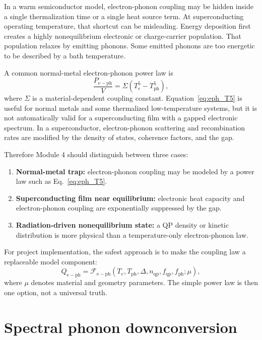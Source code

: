 \documentclass[11pt]{article}
\begin{document}
In a warm semiconductor model, electron-phonon coupling may be hidden inside a single thermalization time or a single heat source term. At superconducting operating temperature, that shortcut can be misleading. Energy deposition first creates a highly nonequilibrium electronic or charge-carrier population. That population relaxes by emitting phonons. Some emitted phonons are too energetic to be described by a bath temperature.

A common normal-metal electron-phonon power law is
\begin{equation}
\frac{P_{\mathrm{e-ph}}}{V}=\Sigma\left(T_e^5-T_{\mathrm{ph}}^5\right),
\label{eq:eph_T5}
\end{equation}
where \(\Sigma\) is a material-dependent coupling constant. Equation~\eqref{eq:eph_T5} is useful for normal metals and some thermalized low-temperature systems, but it is not automatically valid for a superconducting film with a gapped electronic spectrum. In a superconductor, electron-phonon scattering and recombination rates are modified by the density of states, coherence factors, and the gap.

Therefore Module 4 should distinguish between three cases:
\begin{enumerate}[label=\arabic*.]
\item \textbf{Normal-metal trap:} electron-phonon coupling may be modeled by a power law such as Eq.~\eqref{eq:eph_T5}.
\item \textbf{Superconducting film near equilibrium:} electronic heat capacity and electron-phonon coupling are exponentially suppressed by the gap.
\item \textbf{Radiation-driven nonequilibrium state:} a QP density or kinetic distribution is more physical than a temperature-only electron-phonon law.
\end{enumerate}

For project implementation, the safest approach is to make the coupling law a replaceable model component:
\begin{equation}
Q_{\mathrm{e-ph}} = \mathcal{F}_{\mathrm{e-ph}}(T_e,T_{\mathrm{ph}},\Delta,n_{\mathrm{qp}},f_{\mathrm{qp}},f_{\mathrm{ph}};\mu),
\end{equation}
where \(\mu\) denotes material and geometry parameters. The simple power law is then one option, not a universal truth.

\section{Spectral phonon downconversion}
\end{document}
